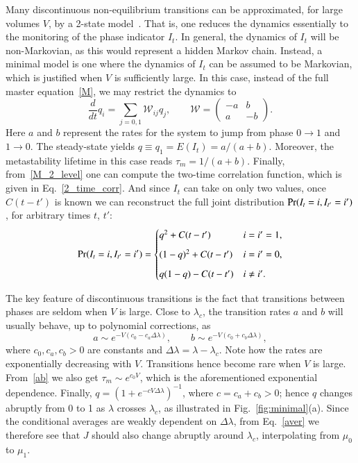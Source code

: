 \documentclass[aps,pre,reprint, amsmath, amssymb,superscriptaddress]{revtex4-1}
\begin{document}
Many discontinuous non-equilibrium transitions can be approximated, for large volumes $V$, by a 2-state model~\cite{hanggi1984bistable}. 
That is, one reduces the dynamics essentially to the monitoring of the phase indicator $I_t$. 
In general, the dynamics of $I_t$ will be non-Markovian, as this would represent a hidden Markov chain. 
Instead, a minimal model is one where the dynamics of $I_t$ can be assumed to be Markovian, which is justified when $V$ is sufficiently large. 
In this case, instead of the full master equation~\eqref{M}, we may restrict the dynamics to 
\begin{equation}\label{M_2_level}
    \frac{d}{dt} q_i = \sum\limits_{j = 0,1} \mathcal{W}_{ij} q_j,
    \qquad 
    \mathcal{W} = \begin{pmatrix}
    -a & b \\[0.2cm]
    a & -b
    \end{pmatrix}.
\end{equation}
Here $a$ and $b$ represent the rates for the system to jump from phase $0\to1$ and $1\to 0$.
The steady-state  yields
$q \equiv q_1  =  E(I_t) = a/(a+b)$.
Moreover, the metastability lifetime in this case reads 
$\tau_m = 1/(a+b)$.
Finally, from~\eqref{M_2_level} one can compute the two-time correlation function, which is given in Eq.~\eqref{2_time_corr}.
And since $I_t$ can take on only two values, once $C(t-t')$ is known we can reconstruct the full joint distribution ${\rm Pr}(I_t = i, I_{t'} = i')$, for arbitrary times $t$, $t'$:
\begin{equation}\label{I_prob_corr}
    {\rm Pr}(I_t = i, I_{t'} = i') = \begin{cases}
    q^2 + C(t-t') & i=i'=1, \\[0.2cm]
    (1-q)^2 + C(t-t') & i=i'=0, \\[0.2cm]
    q(1-q) - C(t-t') & i\neq i'.
    \end{cases}
\end{equation}


The key feature of discontinuous transitions is the fact that transitions between phases are seldom when $V$ is large.
Close to $\lambda_c$, the transition rates $a$ and $b$ will usually behave, up to polynomial corrections, as
\begin{equation}\label{ab}
    a \sim e^{-V (c_0 - c_a \Delta \lambda)},
    \qquad 
    b \sim e^{- V(c_0 + c_b \Delta \lambda)},
\end{equation}
where $c_0,c_a,c_b >0$ are constants and $\Delta \lambda = \lambda - \lambda_c$. 
Note how the rates are  exponentially decreasing with  $V$. 
Transitions hence become rare when $V$ is large. 
From~\eqref{ab} we also get $\tau_m \sim e^{c_0 V}$, which is the aforementioned exponential dependence.
Finally, $q = (1+e^{-c V \Delta \lambda})^{-1}$, where $c=c_a+c_b>0$; hence $q$ changes  abruptly from 0 to 1 as $\lambda$ crosses $\lambda_c$, as illustrated in Fig.~\ref{fig:minimal}(a).
Since the conditional averages are weakly dependent on $\Delta \lambda$, from Eq.~\eqref{aver} we therefore see that $J$ should also change abruptly around $\lambda_c$, interpolating from $\mu_0$ to $\mu_1$. 
\end{document}
